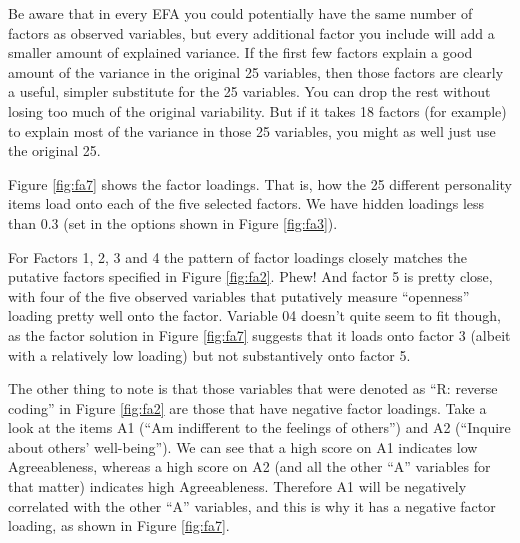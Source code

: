 \documentclass[
]{book}
\begin{document}
Be aware that in every EFA you could potentially have the same number of factors as observed variables, but every additional factor you include will add a smaller amount of explained variance. If the first few factors explain a good amount of the variance in the original 25 variables, then those factors are clearly a useful, simpler substitute for the 25 variables. You can drop the rest without losing too much of the original variability. But if it takes 18 factors (for example) to explain most of the variance in those 25 variables, you might as well just use the original 25.

Figure \ref{fig:fa7} shows the factor loadings. That is, how the 25 different personality items load onto each of the five selected factors. We have hidden loadings less than 0.3 (set in the options shown in Figure \ref{fig:fa3}).

For Factors 1, 2, 3 and 4 the pattern of factor loadings closely matches the putative factors specified in Figure \ref{fig:fa2}. Phew! And factor 5 is pretty close, with four of the five observed variables that putatively measure ``openness'' loading pretty well onto the factor. Variable 04 doesn't quite seem to fit though, as the factor solution in Figure \ref{fig:fa7} suggests that it loads onto factor 3 (albeit with a relatively low loading) but not substantively onto factor 5.

The other thing to note is that those variables that were denoted as ``R: reverse coding'' in Figure \ref{fig:fa2} are those that have negative factor loadings. Take a look at the items A1 (``Am indifferent to the feelings of others'') and A2 (``Inquire about others' well-being''). We can see that a high score on A1 indicates low Agreeableness, whereas a high score on A2 (and all the other ``A'' variables for that matter) indicates high Agreeableness. Therefore A1 will be negatively correlated with the other ``A'' variables, and this is why it has a negative factor loading, as shown in Figure \ref{fig:fa7}.
\end{document}
